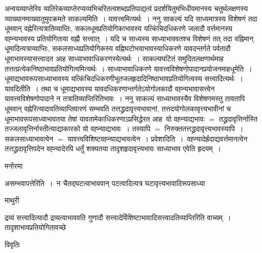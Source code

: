 \documentclass[10pt, openany]{book}
\begin{document}
{अन्वयव्याप्तेरिव व्यतिरेकव्याप्तेरप्यव्यभिचरितत्वशब्दप्रतिपाद्यत्वं प्रदर्शयितुमभिधीयमानस्य चतुर्थलक्षणस्य व्याख्यानमाख्यातुमुपक्रमते {\qt साकल्यमिति}~। यावत्त्वमित्यर्थः~। ननु साकल्यं यदि साध्यमात्रस्य विशेषणं तदा धूमवान् वह्नेरित्यत्रातिव्याप्तिः, सकलधूमप्रतियोगिकाभावस्य यत्किंचिदधिकरणे जलादौ वर्त्तमानस्य वह्न्यभावस्य प्रतियोगिताया वह्नौ सत्त्वात्~। यदि च साध्यस्य साध्याभाववतश्च विशेषणं तत् तदा वह्निमान् धूमादित्यत्राव्याप्तिः, सकलसाध्यप्रतियोगिकस्य वह्निघटोभयाभावस्याधिकरणे यावदन्तर्गते पर्वतादौ धूमाभावस्यासत्त्वादत आह साध्याभावाधिकरणस्येत्यर्थः~। साकल्यघटितं समुदितलक्षणार्थमाह तत्तत्प्रत्येकनिष्ठाभावप्रतियोगित्वमित्यर्थः~। साध्याभावाधिकरणे यावत्त्वविशेषणोपादानप्रयोजनमाहधूमेति~। धूमाद्यभावरूपसाध्याभावस्य यत्किंचिदधिकरणीभूतजलहृदादिनिष्ठाभावप्रतियोगित्वस्य सत्त्वादित्यर्थः~। यावदितीति~। तथा च धूमाद्यभावस्य यावदधिकरणान्तर्गतेऽयोगोलकादौ वह्न्यभावासत्त्वेन यावत्त्वविशेषणोपादाने न तत्रातिव्याप्तिरितिभावः~। ननु साकल्यं साध्याभावस्यैव विशेषणमस्तु तावतापि
धूमवान् वह्नेरित्यादावतिव्याप्तिवारणं सम्भवति तत्तद्ध्रदावृत्त्यभावानां, तत्तदयोगोलकावृत्त्यभावीनां च धूमाभावरूपसाध्याभावतया तेषां यावतामेकाधिकरणाऽप्रसिद्धेरत आह~यो वह्न्याद्यभावः $=$ तद्ध्रदावृत्तिर्नास्ति तज्जलावृत्तिर्नास्तीत्याद्याकारको यो वह्न्याद्यभावः~। तस्यापि $=$ निरुक्ततत्तद्ध्रदावृत्त्यभावस्यापि~। सकलसाध्याभावत्वेन $=$ यावत्त्वविशिष्टवह्न्याद्यभावत्वेन~। {\la प्रवेशादिति~।}~वह्न्यादेर्ह्रदाद्यवर्त्तमानत्वेन तत्तद्ध्रदावृत्तिपदेन
वह्न्यादेरपि धर्तुं शक्यतया तादृशहृदावृत्त्यभावः साध्याभाव एवेति हृदयम्~।
\begin{center}   मनोरमा  \end{center}

{\la असम्भवापत्तेरिति~।}~न चैतद्घटत्वाभाववान् पटत्वादित्यत्र घटावृत्त्यभावादिरूपसाध्या
\newpage
\lfoot{}
 \begin{center}  माथुरी  \end{center} 
{\la द्रव्यं सत्त्वादित्यादौ द्रव्यत्वाभाववति गुणादौ
सत्त्वादेर्विशिष्टाभावादिसत्त्वादतिव्याप्तिरिति वाच्यम्~।  तादृशाभावप्रतियोगितावच्छे}
\begin{center}     विवृतिः \end{center}

}
\end{document}
